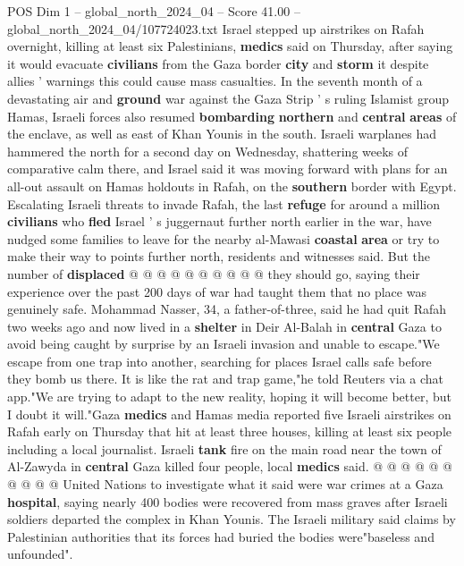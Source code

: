 \begin{textsample}{POS Dim 1 – global\_north\_2024\_04 – Score 41.00 – global\_north\_2024\_04/107724023.txt}  \label{ex:f1_pos_194}
Israel stepped up airstrikes on Rafah overnight, killing at least six Palestinians, \textbf{medics} said on Thursday, after saying it would evacuate \textbf{civilians} from the Gaza border \textbf{city} and \textbf{storm} it despite allies ' warnings this could cause mass casualties.
In the seventh month of a devastating air and \textbf{ground} war against the Gaza Strip ' s ruling Islamist group Hamas, Israeli forces also resumed \textbf{bombarding} \textbf{northern} and \textbf{central} \textbf{areas} of the enclave, as well as east of Khan Younis in the south.
Israeli warplanes had hammered the north for a second day on Wednesday, shattering weeks of comparative calm there, and Israel said it was moving forward with plans for an all-out assault on Hamas holdouts in Rafah, on the \textbf{southern} border with Egypt.
Escalating Israeli threats to invade Rafah, the last \textbf{refuge} for around a million \textbf{civilians} who \textbf{fled} Israel ' s juggernaut further north earlier in the war, have nudged some families to leave for the nearby al-Mawasi \textbf{coastal} \textbf{area} or try to make their way to points further north, residents and witnesses said.
But the number of \textbf{displaced} @ @ @ @ @ @ @ @ @ @ they should go, saying their experience over the past 200 days of war had taught them that no place was genuinely safe.
Mohammad Nasser, 34, a father-of-three, said he had quit Rafah two weeks ago and now lived in a \textbf{shelter} in Deir Al-Balah in \textbf{central} Gaza to avoid being caught by surprise by an Israeli invasion and unable to escape."We escape from one trap into another, searching for places Israel calls safe before they bomb us there.
It is like the rat and trap game,"he told Reuters via a chat app."We are trying to adapt to the new reality, hoping it will become better, but I doubt it will."Gaza \textbf{medics} and Hamas media reported five Israeli airstrikes on Rafah early on Thursday that hit at least three houses, killing at least six people including a local journalist.
Israeli \textbf{tank} fire on the main road near the town of Al-Zawyda in \textbf{central} Gaza killed four people, local \textbf{medics} said. @ @ @ @ @ @ @ @ @ @ United Nations to investigate what it said were war crimes at a Gaza \textbf{hospital}, saying nearly 400 bodies were recovered from mass graves after Israeli soldiers departed the complex in Khan Younis.
The Israeli military said claims by Palestinian authorities that its forces had buried the bodies were"baseless and unfounded".

\end{textsample}
